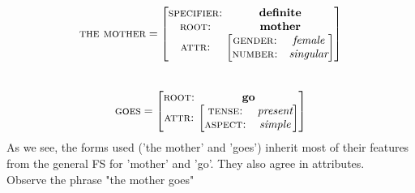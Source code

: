 \documentclass[12pt,a4paper]{article}
\begin{document}
	\[
\textsc{the mother}=
\begin{bmatrix}
\textsc{specifier:} & \mspace{-12mu} \begin{matrix} \textbf{definite} \end{matrix} \\
\textsc{root:} & \mspace{-12mu} \begin{matrix} \textbf{mother} \end{matrix} \\
\begin{matrix} \textsc{attr:} \end{matrix} &
\mspace{-12mu}
\begin{bmatrix}
  \textsc{gender:} & \textit{female}\\
  \textsc{number:} & \textit{singular}\\
\end{bmatrix}
\end{bmatrix}
\]\\
\[
\textsc{goes}=
\begin{bmatrix}
\textsc{root:} & \mspace{-12mu} \begin{matrix} \textbf{go} \end{matrix} \\
\begin{matrix} \textsc{attr:} \end{matrix} &
\mspace{-12mu}
\begin{bmatrix}
  \textsc{tense:} & \textit{present}\\
  \textsc{aspect:} & \textit{simple}\\
\end{bmatrix}
\end{bmatrix}
\]
		As we see, the forms used ('the mother' and 'goes') inherit most of their features from the general FS for 'mother' and 'go'. They also agree in attributes.\\
		Observe the phrase "the mother goes"\\
			
\end{document}
